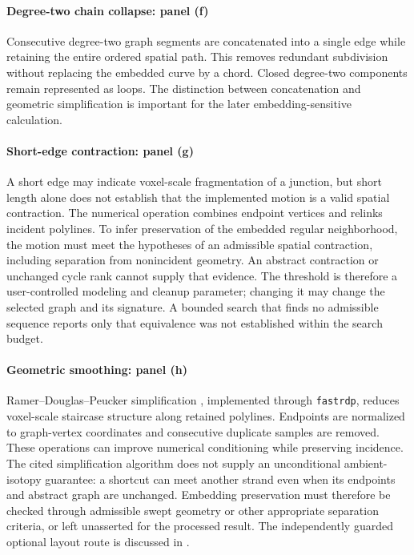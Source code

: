 \paragraph{Degree-two chain collapse: panel (f)}
Consecutive degree-two graph segments are concatenated into a single edge while retaining the entire ordered spatial path. This removes redundant subdivision without replacing the embedded curve by a chord. Closed degree-two components remain represented as loops. The distinction between concatenation and geometric simplification is important for the later embedding-sensitive calculation.

\paragraph{Short-edge contraction: panel (g)}
A short edge may indicate voxel-scale fragmentation of a junction, but short length alone does not establish that the implemented motion is a valid spatial contraction. The numerical operation combines endpoint vertices and relinks incident polylines. To infer preservation of the embedded regular neighborhood, the motion must meet the hypotheses of an admissible spatial contraction, including separation from nonincident geometry. An abstract contraction or unchanged cycle rank cannot supply that evidence. The threshold is therefore a user-controlled modeling and cleanup parameter; changing it may change the selected graph and its signature. A bounded search that finds no admissible sequence reports only that equivalence was not established within the search budget.

\paragraph{Geometric smoothing: panel (h)}
Ramer--Douglas--Peucker simplification \cite{kg_ramer1972,kg_douglas1973}, implemented through \texttt{fastrdp}, reduces voxel-scale staircase structure along retained polylines. Endpoints are normalized to graph-vertex coordinates and consecutive duplicate samples are removed. These operations can improve numerical conditioning while preserving incidence. The cited simplification algorithm does not supply an unconditional ambient-isotopy guarantee: a shortcut can meet another strand even when its endpoints and abstract graph are unchanged. Embedding preservation must therefore be checked through admissible swept geometry or other appropriate separation criteria, or left unasserted for the processed result. The independently guarded optional layout route is discussed in .

